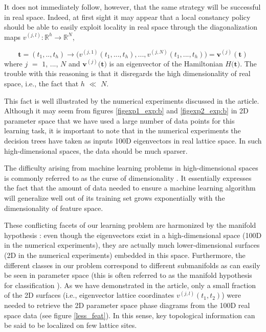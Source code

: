 \documentclass[fleqn,10pt]{wlscirep}
\begin{document}
It does not immediately follow, however, that the same strategy will be successful in real space. Indeed, at first sight it may appear that a local constancy policy should be able to easily exploit locality in real space through the diagonalization maps $v^{(j,l)}: \mathbb{R}^h \rightarrow \mathbb{R}^{N}$,

\begin{equation}
\label{parameter_to_real}
\mathbf{t} = (t_1,..,t_h) \rightarrow \Big(v^{(j,1)}(t_1,...,t_h),...,v^{(j,N)}(t_1,...,t_h)\Big) = \mathbf{v}^{(j)}(\mathbf{t}) 
\end{equation}
where $j$ $=$ $1$, ..., $N$ and $\mathbf{v}^{(j)}$$($$\mathbf{t}$$)$ is an eigenvector of the Hamiltonian $H$$($$\mathbf{t}$$)$. The trouble with this reasoning is that it disregards the high dimensionality of real space, i.e., the fact that $h$ $\ll$ $N$.

This fact is well illustrated by the numerical experiments discussed in the article. Although it may seem from figures \ref{figexp1_exp:b} and \ref{figexp2_exp:b} in 2D parameter space that we have used a large number of data points for this learning task, it is important to note that in the numerical experiments the decision trees have taken as inputs 100D eigenvectors in real lattice space. In such high-dimensional spaces, the data should be much sparser.

The difficulty arising from machine learning problems in high-dimensional spaces is commonly referred to as the curse of dimensionality . It essentially expresses the fact that the amount of data needed to ensure a machine learning algorithm will generalize well out of its training set grows exponentially with the dimensionality of feature space.

These conflicting facets of our learning problem are harmonized by the manifold hypothesis : even though the eigenvectors exist in a high-dimensional space (100D in the numerical experiments), they are actually much lower-dimensional surfaces (2D in the numerical experiments) embedded in this space. Furthermore, the different classes in our problem correspond to different submanifolds as can easily be seen in parameter space (this is often referred to as the manifold hypothesis for classification ). As we have demonstrated in the article, only a small fraction of the 2D surfaces (i.e., eigenvector lattice coordinates $v^{(j,l)}(t_1,t_2)$) were needed to retrieve the 2D parameter space phase diagrams from the 100D real space data (see figure \ref{less_feat}). In this sense, key topological information can be said to be localized on few lattice sites.
\end{document}
